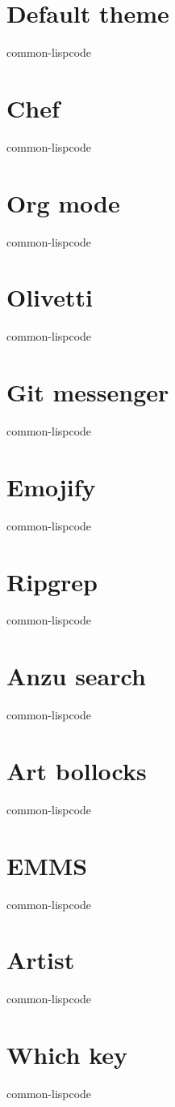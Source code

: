 \documentclass[11pt]{article}
\begin{document}
\section{Default theme}
\label{sec:orgf06d33c}
common-lispcode
\section{Chef}
\label{sec:org36563a0}
common-lispcode
\section{Org mode}
\label{sec:org952dc4a}
common-lispcode
\section{Olivetti}
\label{sec:orgd9bc22e}
common-lispcode
\section{Git messenger}
\label{sec:orgaa86290}
common-lispcode
\section{Emojify}
\label{sec:org84bc5eb}
common-lispcode
\section{Ripgrep}
\label{sec:org2723d3a}
common-lispcode
\section{Anzu search}
\label{sec:org11352c2}
common-lispcode
\section{Art bollocks}
\label{sec:org1e43adb}
common-lispcode
\section{EMMS}
\label{sec:org2bf2d7a}
common-lispcode
\section{Artist}
\label{sec:org69fd7dc}
common-lispcode
\section{Which key}
\label{sec:org84fa8f1}
common-lispcode
\end{document}
